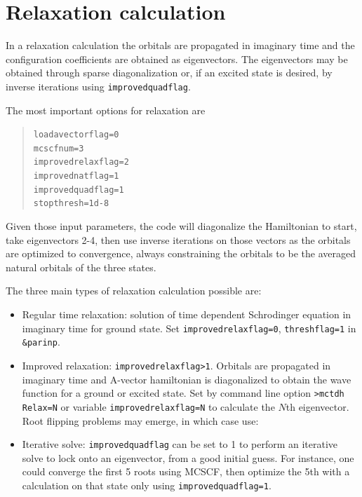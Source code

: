 \documentclass[10pt,leqno, oneside]{book}
\begin{document}
\section{Relaxation calculation}

In a relaxation calculation the orbitals are propagated in imaginary time and the configuration coefficients
are obtained as eigenvectors.  The eigenvectors may be obtained through sparse diagonalization or, if 
an excited state is desired, by inverse iterations using \verb#improvedquadflag#.

The most important options for relaxation are
\begin{quote}
{\footnotesize
\verb#loadavectorflag=0#\\
\verb#mcscfnum=3# \\
\verb#improvedrelaxflag=2# \\
\verb#improvednatflag=1# \\
\verb#improvedquadflag=1# \\
\verb#stopthresh=1d-8# \\
}\end{quote}
Given those input parameters, the code will diagonalize the Hamiltonian to start, take eigenvectors 2-4, then use inverse iterations
on those vectors as the orbitals are optimized to convergence, always constraining the orbitals to be the averaged natural orbitals of the
three states.

The three main types of relaxation calculation possible are:
\begin{itemize}
\item{Regular time relaxation: solution of time dependent Schrodinger equation in imaginary time for ground state.  
Set \verb#improvedrelaxflag=0#, \verb#threshflag=1# in \verb#&parinp#.}
\item{Improved relaxation: \verb#improvedrelaxflag>1#.  
Orbitals are propagated in imaginary time and A-vector hamiltonian is diagonalized to obtain the wave function 
for a ground or excited state.
Set by command line option \verb#>mctdh Relax=N# or variable \verb#improvedrelaxflag=N# to calculate the $N$th eigenvector.
Root flipping problems may emerge, in which case use:}
\item{Iterative solve: \verb#improvedquadflag# can be set to 1 to perform an iterative solve to lock onto an eigenvector, from a good initial
guess.  For instance, one could converge the first 5 roots using MCSCF, then optimize the 5th with a calculation on that state only using
\verb#improvedquadflag=1#.  }
\end{itemize}
\end{document}
